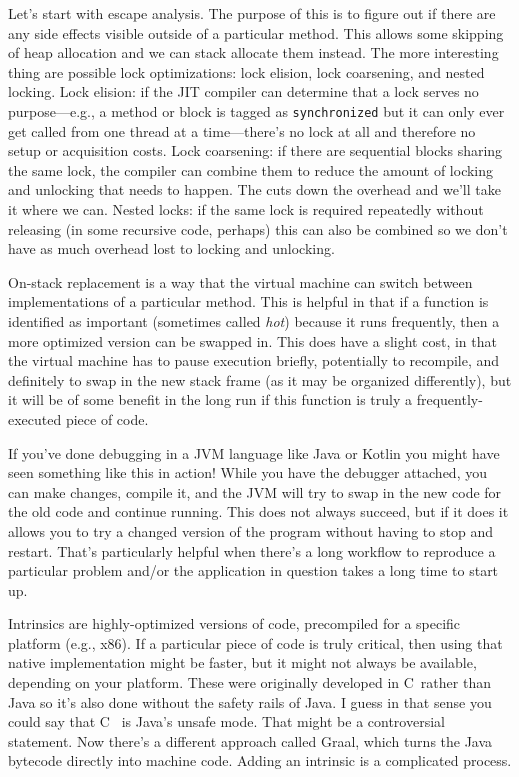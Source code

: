 \documentclass[a4paper]{report}
\newcommand{\CPP}{C\nolinebreak\hspace{-.05em}\raisebox{.4ex}{\tiny\bf +}\nolinebreak\hspace{-.10em}\raisebox{.4ex}{\tiny\bf +}}
\def\CPP{{C\nolinebreak[4]\hspace{-.05em}\raisebox{.4ex}{\tiny\bf ++}}}
\begin{document}
Let's start with escape analysis. The purpose of this is to figure out if there are any side effects visible outside of a particular method. This allows some skipping of heap allocation and we can stack allocate them instead. The more interesting thing are possible lock optimizations: lock elision, lock coarsening, and nested locking. Lock elision: if the JIT compiler can determine that a lock serves no purpose---e.g., a method or block is tagged as \texttt{synchronized} but it can only ever get called from one thread at a time---there's no lock at all and therefore no setup or acquisition costs.  Lock coarsening: if there are sequential blocks sharing the same lock, the compiler can combine them to reduce the amount of locking and unlocking that needs to happen. The cuts down the overhead and we'll take it where we can. Nested locks: if the same lock is required repeatedly without releasing (in some recursive code, perhaps) this can also be combined so we don't have as much overhead lost to locking and unlocking.

On-stack replacement is a way that the virtual machine can switch between implementations of a particular method. This is helpful in that if a function is identified as important (sometimes called \textit{hot}) because it runs frequently, then a more optimized version can be swapped in. This does have a slight cost, in that the virtual machine has to pause execution briefly, potentially to recompile, and definitely to swap in the new stack frame (as it may be organized differently), but it will be of some benefit in the long run if this function is truly a frequently-executed piece of code.

If you've done debugging in a JVM language like Java or Kotlin you might have seen something like this in action! While you have the debugger attached, you can make changes, compile it, and the JVM will try to swap in the new code for the old code and continue running. This does not always succeed, but if it does it allows you to try a changed version of the program without having to stop and restart. That's particularly helpful when there's a long workflow to reproduce a particular problem and/or the application in question takes a long time to start up.

Intrinsics are highly-optimized versions of code, precompiled for a specific platform (e.g., x86). If a particular piece of code is truly critical, then using that native implementation might be faster, but it might not always be available, depending on your platform. These were originally developed in \CPP~rather than Java so it's also done without the safety rails of Java. I guess in that sense you could say that \CPP~ is Java's unsafe mode. That might be a controversial statement. Now there's a different approach called Graal, which turns the Java bytecode directly into machine code. Adding an intrinsic is a complicated process.
\end{document}
